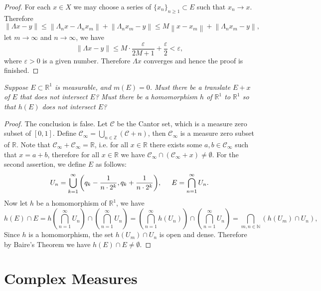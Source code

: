 \begin{proof}
For each $x\in X$ we may choose a series of $\{x_n\}_{n\ge 1}\subset E$ such that $x_n\to x$. Therefore 
$$
\left\| \Lambda x-y \right\| \le \left\| \Lambda _nx-\Lambda _nx_m \right\| +\left\| \Lambda _nx_m-y \right\| \le M\left\| x-x_m \right\| +\left\| \Lambda _nx_m-y \right\| ,
$$
let $m\to\infty$ and $n\to\infty$, we have 
$$
\left\| \Lambda x-y \right\| \le M\cdot \frac{\varepsilon}{2M+1}+\frac{\varepsilon}{2}<\varepsilon ,
$$
where $\varepsilon>0$ is a given number. Therefore $\Lambda x$ converges and hence the proof is finished.
\end{proof}
\begin{problem}\em
Suppose $E\subset\mathbb{R}^1$ is measurable, and $m(E)=0$. Must there be a translate $E+x$ of $E$ that does not intersect $E$? Must there be a homomorphism $h$ of $\mathbb{R}^1$ to $\mathbb{R}^1$ so that $h(E)$ does not intersect $E$?
\end{problem}
\begin{proof}
The conclusion is false. Let $\mathcal{C}$ be the Cantor set, which is a measure zero subset of $[0,1]$. Define $\mathcal{C}_\infty=\bigcup_{n\in\mathbb{Z}}(\mathcal{C}+n)$, then $\mathcal{C}_\infty$ is a measure zero subset of $\mathbb{R}$. Note that $\mathcal{C}_\infty+\mathcal{C}_\infty=\mathbb{R}$, i.e. for all $x\in\mathbb{R}$ there exists some $a,b\in\mathcal{C}_\infty$ such that $x=a+b$, therefore for all $x\in\mathbb{R}$ we have $\mathcal{C}_\infty\cap(\mathcal{C}_\infty+x)\ne\emptyset$. For the second assertion, we define $E$ as follows: 
$$
U_n=\bigcup_{k=1}^{\infty}{\left( q_k-\frac{1}{n\cdot 2^k},q_k+\frac{1}{n\cdot 2^k} \right)},\hspace{0.5cm}E=\bigcap_{n=1}^{\infty}{U_n}.
$$
Now let $h$ be a homomorphism of $\mathbb{R}^1$, we have 
$$
h\left( E \right) \cap E=h\left( \bigcap_{n=1}^{\infty}{U_n} \right) \cap \left( \bigcap_{n=1}^{\infty}{U_n} \right) =\left( \bigcap_{n=1}^{\infty}{h\left( U_n \right)} \right) \cap \left( \bigcap_{n=1}^{\infty}{U_n} \right) =\bigcap_{m,n\in \mathbb{N}}{\left( h\left( U_m \right) \cap U_n \right)},
$$
Since $h$ is a homomorphism, the set $h(U_m)\cap U_n$ is open and dense. Therefore by Baire's Theorem we have $h(E)\cap E\ne\emptyset$.
\end{proof}
\newpage
\section{Complex Measures}
